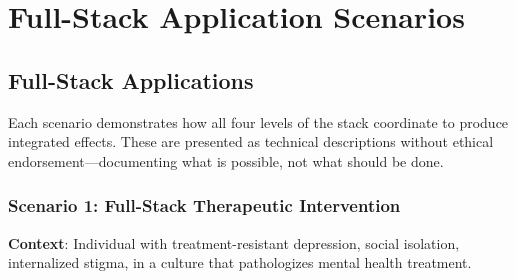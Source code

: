 \documentclass[11pt,twoside]{book}
\begin{document}
\part{Full-Stack Application Scenarios}

\chapter{Full-Stack Applications}
\label{ch:applications}

\begin{tcolorbox}[colback=yellow!5!white,colframe=yellow!65!black,title=\textbf{Scenario Framework}]
Each scenario demonstrates how all four levels of the stack coordinate to produce
integrated effects. These are presented as technical descriptions without ethical
endorsement---documenting what is possible, not what should be done.
\end{tcolorbox}

\section{Scenario 1: Full-Stack Therapeutic Intervention}

\textbf{Context}: Individual with treatment-resistant depression, social isolation,
internalized stigma, in a culture that pathologizes mental health treatment.
\end{document}
